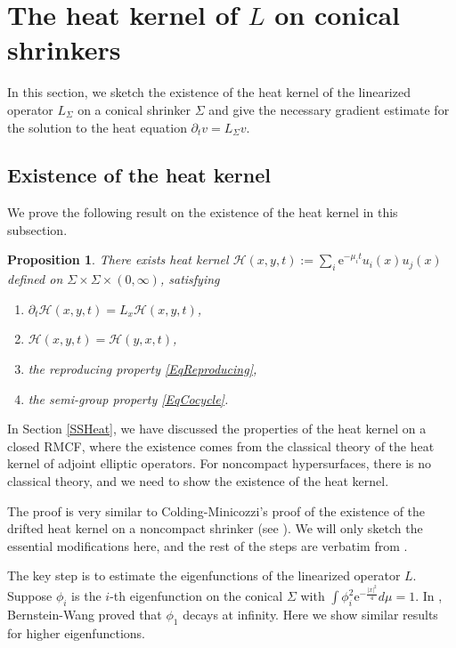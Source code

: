 \documentclass[12pt]{amsart}
\numberwithin{equation}{section}
\newtheorem{proposition}[theorem]{Proposition}
\numberwithin{equation}{section}
\newcommand{\cH}{\mathcal{H}}
\begin{document}
	
	\section{The heat kernel of $L$ on conical shrinkers}\label{AppKernel}
	In this section, we sketch the existence of the heat kernel of the linearized operator $L_\Sigma$ on a conical shrinker $\Sigma$ and give the necessary gradient estimate for the solution to the heat equation $\partial_t v=L_\Sigma v$. 
	
	\subsection{Existence of the heat kernel}
	We prove the following result on the existence of the heat kernel in this subsection. 
	\begin{proposition}\label{prop:HKnoncpt}
		There exists heat kernel $\cH(x,y,t):=\sum_{i}\mathrm{e}^{-\mu_i t}u_i(x)u_j(x)$ defined on $\Sigma\times\Sigma\times(0,\infty)$, satisfying 
		\begin{enumerate}
			\item $\partial_t \cH(x,y,t)=L_x\cH(x,y,t)$,
			\item $\cH(x,y,t)=\cH(y,x,t)$,
			\item the reproducing property \eqref{EqReproducing},
			\item the semi-group property \eqref{EqCocycle}.
		\end{enumerate}
	\end{proposition}
	
	In Section \ref{SSHeat}, we have discussed the properties of the heat kernel on a closed RMCF, where the existence comes from the classical theory of the heat kernel of adjoint elliptic operators. For noncompact hypersurfaces, there is no classical theory, and we need to show the existence of the heat kernel.
	
	The proof is very similar to Colding-Minicozzi's proof of the existence of the drifted heat kernel on a noncompact shrinker (see \cite[Section 5]{CM5}). We will only sketch the essential modifications here, and the rest of the steps are verbatim from \cite{CM5}.
	
	The key step is to estimate the eigenfunctions of the linearized operator $L$. Suppose $\phi_i$ is the $i$-th eigenfunction on the conical $\Sigma$ with $\int \phi_i^2 \mathrm{e}^{-\frac{|x|^2}{4}}d\mu=1$. In \cite{BW}, Bernstein-Wang proved that $\phi_1$ decays at infinity. Here we show similar results for higher eigenfunctions.
	
\end{document}
